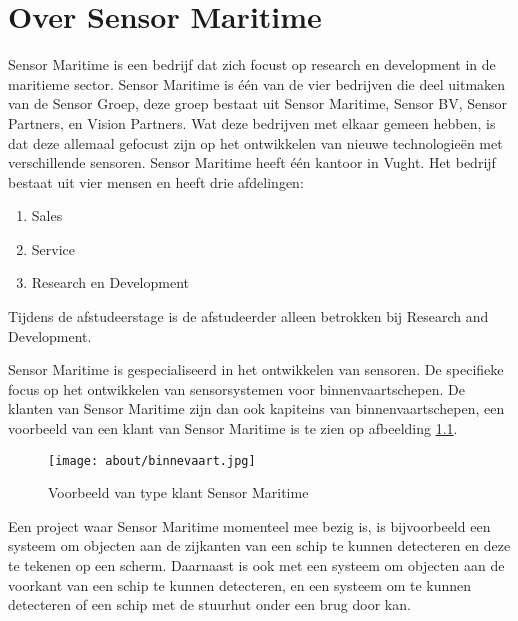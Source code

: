 \chapter{Over Sensor Maritime}
Sensor Maritime is een bedrijf dat zich focust op research en development in de maritieme sector. Sensor Maritime is één van de vier bedrijven die deel uitmaken van de Sensor Groep, deze groep bestaat uit Sensor Maritime, Sensor BV, Sensor Partners, en Vision Partners. Wat deze bedrijven met elkaar gemeen hebben, is dat deze allemaal gefocust zijn op het ontwikkelen van nieuwe technologieën met verschillende sensoren. Sensor Maritime heeft één kantoor in Vught. Het bedrijf bestaat uit vier mensen en heeft drie afdelingen:
\begin{enumerate}
	\item Sales
	\item Service
	\item Research en Development
\end{enumerate}
Tijdens de afstudeerstage is de afstudeerder alleen betrokken bij Research and Development.
\newline

\noindent Sensor Maritime is gespecialiseerd in het ontwikkelen van sensoren. De specifieke focus op het ontwikkelen van sensorsystemen voor binnenvaartschepen. De klanten van Sensor Maritime zijn dan ook kapiteins van binnenvaartschepen, een voorbeeld van een klant van Sensor Maritime is te zien op afbeelding \ref{fig:customer_sensor_maritime}.
\begin{figure}[h!]

	\centering

	\label{fig:customer_sensor_maritime}
	\texttt{[image: about/binnevaart.jpg]}
	\caption{Voorbeeld van type klant Sensor Maritime}

\end{figure}

\noindent Een project waar Sensor Maritime momenteel mee bezig is, is bijvoorbeeld een systeem om objecten aan de zijkanten van een schip te kunnen detecteren en deze te tekenen op een scherm. Daarnaast is ook met een systeem om objecten aan de voorkant van een schip te kunnen detecteren, en een systeem om te kunnen detecteren of een schip met de stuurhut onder een brug door kan.
